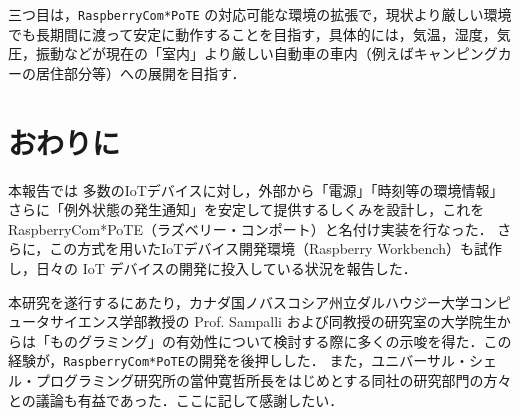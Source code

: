 三つ目は，{\tt Raspberry\-Com*PoTE} の対応可能な環境の拡張で，現状より厳しい環境でも長期間に渡って安定に動作することを目指す，具体的には，気温，湿度，気圧，振動などが現在の「室内」より厳しい自動車の車内（例えばキャンピングカーの居住部分等）への展開を目指す．




\section{おわりに}
\label{sec:07conclusion}

本報告では
多数のIoTデバイスに対し，外部から「電源」「時刻等の環境情報」さらに「例外状態の発生通知」を安定して提供するしくみを設計し，これを RaspberryCom*PoTE（ラズベリー・コンポート）と名付け実装を行なった．
さらに，この方式を用いたIoTデバイス開発環境（Raspberry Workbench）も試作し，日々の IoT デバイスの開発に投入している状況を報告した．





\begin{acknowledgment}

 本研究を遂行するにあたり，カナダ国ノバスコシア州立ダルハウジー大学コンピュータサイエンス学部教授の Prof. Sampalli および同教授の研究室の大学院生からは「ものグラミング」の有効性について検討する際に多くの示唆を得た．この経験が，{\tt Raspberry\-Com*PoTE}の開発を後押しした．
      また，ユニバーサル・シェル・プログラミング研究所の當仲寛哲所長をはじめとする同社の研究部門の方々との議論も有益であった．ここに記して感謝したい．

\end{acknowledgment}


